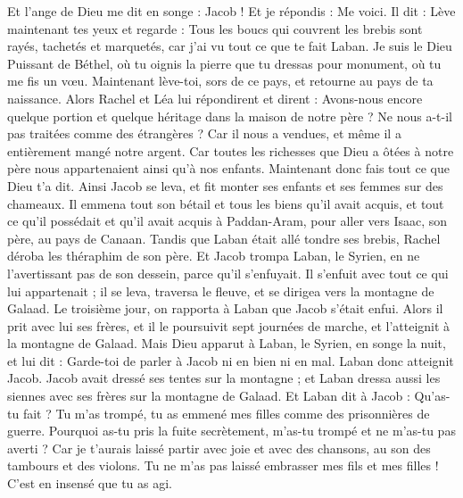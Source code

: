 \begin{multicols}{2}
Et l'ange de Dieu me dit en songe : Jacob ! Et je répondis : Me voici.
Il dit : Lève maintenant tes yeux et regarde : Tous les boucs qui couvrent les brebis sont rayés, tachetés et marquetés, car j'ai vu tout ce que te fait Laban.
Je suis le Dieu Puissant de Béthel, où tu oignis la pierre que tu dressas pour monument, où tu me fis un vœu.  Maintenant lève-toi, sors de ce pays, et retourne au pays de ta naissance.
Alors Rachel et Léa lui répondirent et dirent : Avons-nous encore quelque portion et quelque héritage dans la maison de notre père ?
Ne nous a-t-il pas traitées comme des étrangères ? Car il nous a vendues, et même il a entièrement mangé notre argent.
Car toutes les richesses que Dieu a ôtées à notre père nous appartenaient ainsi qu’à nos enfants. Maintenant donc fais tout ce que Dieu t'a dit.
Ainsi Jacob se leva, et fit monter ses enfants et ses femmes sur des chameaux.
Il emmena tout son bétail et tous les biens qu'il avait acquis, et tout ce qu'il possédait et qu'il avait acquis à Paddan-Aram, pour aller vers Isaac, son père, au pays de Canaan.
Tandis que Laban était allé tondre ses brebis, Rachel déroba les théraphim de son père.
Et Jacob trompa Laban, le Syrien, en ne l’avertissant pas de son dessein, parce qu'il s'enfuyait.
Il s'enfuit avec tout ce qui lui appartenait ; il se leva, traversa le fleuve, et se dirigea vers la montagne de Galaad.
Le troisième jour, on rapporta à Laban que Jacob s’était enfui.
Alors il prit avec lui ses frères, et il le poursuivit sept journées de marche, et l'atteignit à la montagne de Galaad.
Mais Dieu apparut à Laban, le Syrien, en songe la nuit, et lui dit : Garde-toi de parler à Jacob ni en bien ni en mal.
Laban donc atteignit Jacob. Jacob avait dressé ses tentes sur la montagne ; et Laban dressa aussi les siennes avec ses frères sur la montagne de Galaad.
Et Laban dit à Jacob : Qu'as-tu fait ? Tu m’as trompé, tu as emmené mes filles comme des prisonnières de guerre.
Pourquoi as-tu pris la fuite secrètement, m’as-tu trompé et ne m’as-tu pas averti ? Car je t'aurais laissé partir avec joie et avec des chansons, au son des tambours et des violons.
Tu ne m'as pas laissé embrasser mes fils et mes filles ! C’est en insensé que tu as agi.

\end{multicols}
